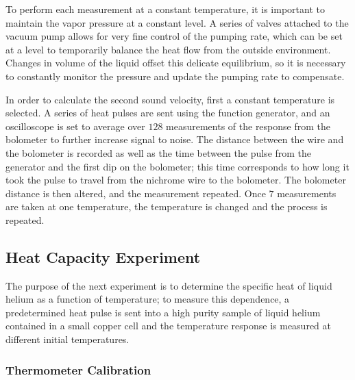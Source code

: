 To perform each measurement at a constant temperature, it is important to maintain the vapor pressure at a constant level. A series of valves attached to the vacuum pump allows for very fine control of the pumping rate, which can be set at a level to temporarily balance the heat flow from the outside environment. Changes in volume of the liquid offset this delicate equilibrium, so it is necessary to constantly monitor the pressure and update the pumping rate to compensate.

In order to calculate the second sound velocity, first a constant temperature is selected. A series of heat pulses are sent using the function generator, and an oscilloscope is set to average over $128$ measurements of the response from the bolometer to further increase signal to noise. The distance between the wire and the bolometer is recorded as well as the time between the pulse from the generator and the first dip on the bolometer; this time corresponds to how long it took the pulse to travel from the nichrome wire to the bolometer. The bolometer distance is then altered, and the measurement repeated. Once $7$ measurements are taken at one temperature, the temperature is changed and the process is repeated.

\subsection{Heat Capacity Experiment}\label{heatcapacityexperiment}

The purpose of the next experiment is to determine the specific heat
of liquid helium as a function of temperature; to measure this
dependence, a predetermined heat pulse is sent into a high purity sample
of liquid helium contained in a small copper cell and the temperature
response is measured at different initial temperatures.

\subsubsection{Thermometer Calibration}\label{thermometercalibration}

